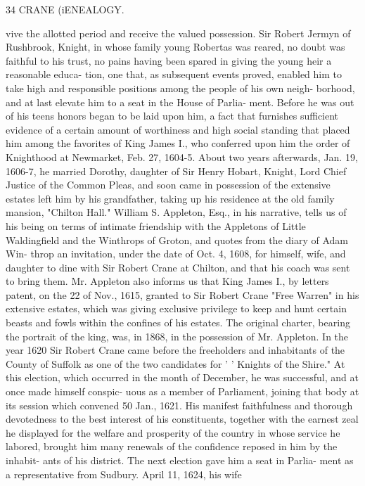 34 CRANE (iENEALOGY. 

vive the allotted period and receive the valued possession. Sir 
Robert Jermyn of Rushbrook, Knight, in whose family young 
Robertas was reared, no doubt was faithful to his trust, no pains 
having been spared in giving the young heir a reasonable educa- 
tion, one that, as subsequent events proved, enabled him to take 
high and responsible positions among the people of his own neigh- 
borhood, and at last elevate him to a seat in the House of Parlia- 
ment. Before he was out of his teens honors began to be laid 
upon him, a fact that furnishes sufficient evidence of a certain 
amount of worthiness and high social standing that placed him 
among the favorites of King James I., who conferred upon him 
the order of Knighthood at Newmarket, Feb. 27, 1604-5. About 
two years afterwards, Jan. 19, 1606-7, he married Dorothy, 
daughter of Sir Henry Hobart, Knight, Lord Chief Justice of the 
Common Pleas, and soon came in possession of the extensive 
estates left him by his grandfather, taking up his residence at the 
old family mansion, "Chilton Hall." William S. Appleton, 
Esq., in his narrative, tells us of his being on terms of intimate 
friendship with the Appletons of Little Waldingfield and the 
Winthrops of Groton, and quotes from the diary of Adam Win- 
throp an invitation, under the date of Oct. 4, 1608, for himself, 
wife, and daughter to dine with Sir Robert Crane at Chilton, and 
that his coach was sent to bring them. Mr. Appleton also 
informs us that King James I., by letters patent, on the 22 of 
Nov., 1615, granted to Sir Robert Crane "Free Warren" in his 
extensive estates, which was giving exclusive privilege to keep 
and hunt certain beasts and fowls within the confines of his 
estates. The original charter, bearing the portrait of the king, 
was, in 1868, in the possession of Mr. Appleton. In the year 
1620 Sir Robert Crane came before the freeholders and inhabitants 
of the County of Suffolk as one of the two candidates for ' ' Knights 
of the Shire." At this election, which occurred in the month of 
December, he was successful, and at once made himself conspic- 
uous as a member of Parliament, joining that body at its session 
which convened 50 Jan., 1621. His manifest faithfulness and 
thorough devotedness to the best interest of his constituents, 
together with the earnest zeal he displayed for the welfare and 
prosperity of the country in whose service he labored, brought 
him many renewals of the confidence reposed in him by the inhabit- 
ants of his district. The next election gave him a seat in Parlia- 
ment as a representative from Sudbury. April 11, 1624, his wife 



